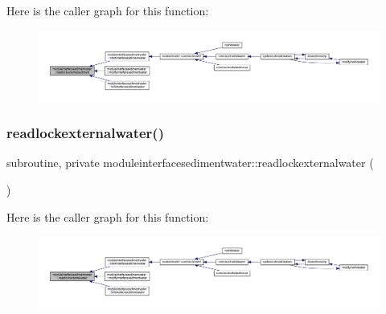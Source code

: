 Here is the caller graph for this function\+:\nopagebreak
\begin{figure}[H]
\begin{center}
\leavevmode
\includegraphics[width=350pt]{namespacemoduleinterfacesedimentwater_a0c18da6cbbd1ae812489854544d199b6_icgraph}
\end{center}
\end{figure}
\mbox{\label{namespacemoduleinterfacesedimentwater_abd721cef18474ae3e82464d38e46a5e1}} 
\subsubsection{\texorpdfstring{readlockexternalwater()}{readlockexternalwater()}}
{\footnotesize\ttfamily subroutine, private moduleinterfacesedimentwater\+::readlockexternalwater (\begin{DoxyParamCaption}{ }\end{DoxyParamCaption})\hspace{0.3cm}{\ttfamily [private]}}

Here is the caller graph for this function\+:\nopagebreak
\begin{figure}[H]
\begin{center}
\leavevmode
\includegraphics[width=350pt]{namespacemoduleinterfacesedimentwater_abd721cef18474ae3e82464d38e46a5e1_icgraph}
\end{center}
\end{figure}
\mbox{\label{namespacemoduleinterfacesedimentwater_a86923875b20b0ddacafa24243a465222}} 
